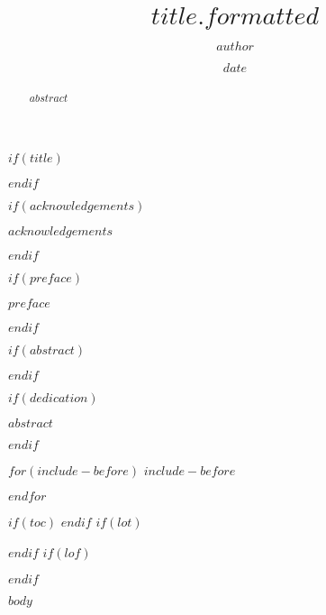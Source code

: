 \documentclass[12pt,twoside]{reedthesis}
\title{$title.formatted$}
\author{$author$}
\date{$date$}
\begin{document}
$if(title)$
\maketitle
$endif$

  \frontmatter %
  \pagestyle{empty} %

$if(acknowledgements)$
\begin{acknowledgements}
$acknowledgements$
\end{acknowledgements}
$endif$

$if(preface)$
\begin{preface}
$preface$
\end{preface}
$endif$

$if(abstract)$
\begin{abstract}
$abstract$
\end{abstract}
$endif$

$if(dedication)$
\begin{dedication}
$abstract$
\end{dedication}
$endif$

$for(include-before)$
$include-before$

$endfor$

$if(toc)$
{
\hypersetup{linkcolor=$if(toccolor)$$toccolor$$else$black$endif$}
\setcounter{tocdepth}{$toc-depth$}
\tableofcontents
}
$endif$
$if(lot)$
\listoftables
$endif$
$if(lof)$
\listoffigures
$endif$

%

$body$
\end{document}
